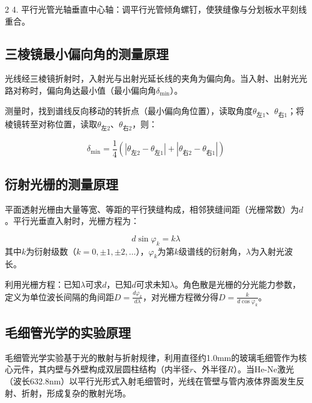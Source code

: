 \documentclass[12pt,a4paper]{article}
\begin{document}
\begin{multicols}{2}
      4. 平行光管光轴垂直中心轴：调平行光管倾角螺钉，使狭缝像与分划板水平刻线重合。





    \subsection{\heiti 三棱镜最小偏向角的测量原理}

    光线经三棱镜折射时，入射光与出射光延长线的夹角为偏向角。当入射、出射光光路对称时，偏向角达最小值（最小偏向角$\delta_{\text{min}}$）。



    测量时，找到谱线反向移动的转折点（最小偏向角位置），读取角度$\theta_{\text{左}1}、\theta_{\text{右}1}$；将棱镜转至对称位置，读取$\theta_{\text{左}2}、\theta_{\text{右}2}$，则：

    \[
        \delta_{\text{min}} = \frac{1}{4}\left(|\theta_{\text{左}2} - \theta_{\text{左}1}| + |\theta_{\text{右}2} - \theta_{\text{右}1}|\right)
        \]
    



    \subsection{\heiti 衍射光栅的测量原理}

    平面透射光栅由大量等宽、等距的平行狭缝构成，相邻狭缝间距（光栅常数）为$d$。平行光垂直入射时，光栅方程为：

    \[
        d\sin\varphi_k = k\lambda
        \]
        其中$k$为衍射级数（$k=0,\pm1,\pm2,\dots$），$\varphi_k$为第$k$级谱线的衍射角，$\lambda$为入射光波长。



    利用光栅方程：已知$\lambda$可求$d$，已知$d$可求未知$\lambda$。角色散是光栅的分光能力参数，定义为单位波长间隔的角间距$D = \frac{d\varphi_k}{d\lambda}$，对光栅方程微分得$D = \frac{k}{d\cos\varphi_k}$。





    \subsection{\heiti 毛细管光学的实验原理}

    \songti

    毛细管光学实验基于光的散射与折射规律，利用直径约1.0mm的玻璃毛细管作为核心元件，其内壁与外壁构成双层圆柱结构（内半径$r$、外半径$R$）。当He-Ne激光（波长632.8nm）以平行光形式入射毛细管时，光线在管壁与管内液体界面发生反射、折射，形成复杂的散射光场。




\end{multicols}
\end{document}
